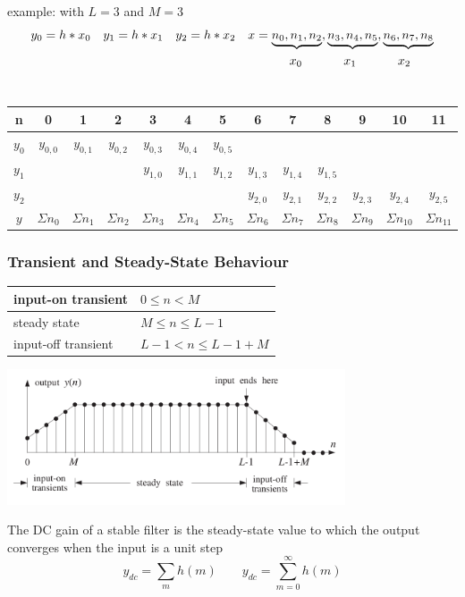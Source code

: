 example: with $L=3$ and $M=3$
\begin{align}
& y_0=h\ast x_0 && y_1=h\ast x_1 && y_2=h\ast x_2 && x={\underbrace{n_0,n_1,n_2},\underbrace{n_3,n_4,n_5},\underbrace{n_6,n_7,n_8}}\notag \\
& && && && \qquad\quad \ x_0 \qquad\quad \ x_1 \qquad\quad \ x_2 \notag
\end{align}\\

\begin{tabular}{c|cccccccccccc}  
	n & 0 & 1 & 2 & 3 & 4 & 5 & 6 & 7 & 8 & 9 & 10 & 11\\
	\hline
	$y_0$ & $y_{0,0}$ & $y_{0,1}$ & $y_{0,2}$ & $y_{0,3}$ & $y_{0,4}$ & $y_{0,5}$ &
	& & & & &\\
	$y_1$ & & & & $y_{1,0}$ & $y_{1,1}$ & $y_{1,2}$ & $y_{1,3}$ & $y_{1,4}$ &
	$y_{1,5}$ & & & \\
	$y_2$ & & & & & & & $y_{2,0}$ & $y_{2,1}$ & $y_{2,2}$ & $y_{2,3}$ & $y_{2,4}$ & $y_{2,5}$
	\\
	\hline
	$y$ & $\Sigma n_{0}$ & $\Sigma n_{1}$&$\Sigma n_{2}$ & $\Sigma n_{3}$&$\Sigma n_{4}$ &$\Sigma n_{5}$ &$\Sigma n_{6}$  &$\Sigma n_{7}$  & $\Sigma n_{8}$ & $\Sigma n_{9}$ & $\Sigma n_{10}$ & $\Sigma n_{11}$
	\\
\end{tabular}


\subsubsection{Transient and Steady-State Behaviour}
\begin{multicols}{2}
\begin{tabular}{|l|l|}
	\hline
	input-on transient	& $ 0 \leq n < M $
	\\ \hline
	steady state			& $ M \leq n \leq L-1 $
	\\ \hline
	input-off transient		& $ L-1 < n \leq L-1+M $
	\\ \hline
\end{tabular}
\columnbreak
\includegraphics[width=10cm]{./picture/transient_steady_state}
\end{multicols}
The DC gain of a stable filter is the steady-state value to which the output converges when the input is a unit step
\[ y_{dc} = \sum_{m}^{} h(m) \qquad y_{dc}=\sum_{m=0}^{\infty}h(m) \]


